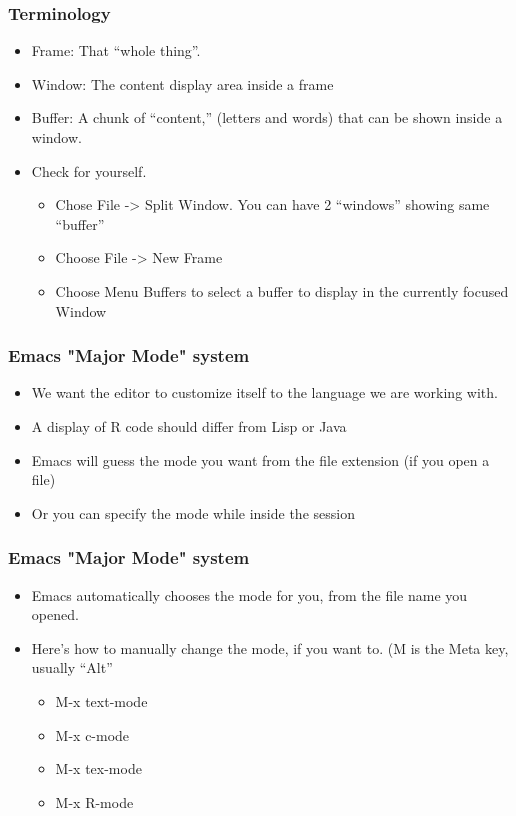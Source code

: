 \documentclass[11pt,english]{beamer}
\begin{document}
\begin{frame}[containsverbatim]
  \frametitle{Terminology}
  \begin{itemize}
  \item Frame: That ``whole thing''. 
  \item Window: The content display area inside a frame
  \item Buffer: A chunk of ``content,'' (letters and words) that can
    be shown inside a window.
  \item Check for yourself.

    \begin{itemize}
    \item Chose File -> Split Window. You can have 2 ``windows'' showing same
      ``buffer''
    \item Choose File -> New Frame
    \item Choose Menu Buffers to select a buffer to display in the currently
      focused Window
    \end{itemize}
  \end{itemize}
\end{frame}

\begin{frame}[containsverbatim]
  \frametitle{Emacs "Major Mode" system}
  \begin{itemize}
  \item We want the editor to customize itself to the language we are working
    with.
  \item A display of R code should differ from Lisp or Java
  \item Emacs will guess the mode you want from the file extension (if you
    open a file)
  \item Or you can specify the mode while inside the session

  \end{itemize}
\end{frame}

\begin{frame}[containsverbatim]
  \frametitle{Emacs "Major Mode" system}
  \begin{itemize}
  \item Emacs automatically chooses the mode for you, from the file
    name you opened.
  \item Here's how to manually change the mode, if you want to. (M is
    the Meta key, usually ``Alt''

    \begin{itemize}
    \item M-x text-mode
    \item M-x c-mode
    \item M-x tex-mode
    \item M-x R-mode 
    \end{itemize}
  \end{itemize}
\end{frame}
\end{document}
